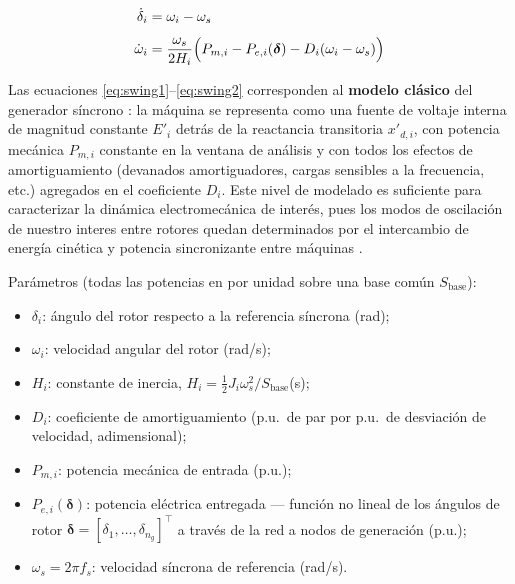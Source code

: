 \begin{align}
    \dot{\delta}_i  &= \omega_i - \omega_s \label{eq:swing1} \\[4pt]
    \dot{\omega}_i  &= \frac{\omega_s}{2H_i}
                       \Bigl(P_{m,i} - P_{e,i}(\boldsymbol{\delta}) - 
                       D_i(\omega_i - \omega_s)\Bigr)
                       \label{eq:swing2}
\end{align}

Las ecuaciones \eqref{eq:swing1}--\eqref{eq:swing2} corresponden al
\textbf{modelo clásico} del generador síncrono \cite{kundur1994}: la máquina
se representa como una fuente de voltaje interna de magnitud constante
$E'_i$ detrás de la reactancia transitoria $x'_{d,i}$, con potencia mecánica
$P_{m,i}$ constante en la ventana de análisis y con todos los efectos de
amortiguamiento (devanados amortiguadores, cargas sensibles a la frecuencia, etc.)
agregados en el coeficiente $D_i$. Este nivel de modelado es suficiente para
caracterizar la dinámica electromecánica de interés, pues los modos de
oscilación de nuestro interes  entre rotores quedan determinados por el intercambio de 
energía cinética y potencia sincronizante entre máquinas \cite{kundur1994,sauer2017}.


Parámetros (todas las potencias en por unidad sobre una base común
$S_{\text{base}}$):

\begin{itemize}
    \item $\delta_i$: ángulo del rotor respecto a la referencia síncrona (rad);
    \item $\omega_i$: velocidad angular del rotor (rad/s);
    \item $H_i$: constante de inercia, $H_i = \tfrac{1}{2}J_i\omega_s^2/S_{\text{base}}$(s);
    \item $D_i$: coeficiente de amortiguamiento (p.u.\ de par por
          p.u.\ de desviación de velocidad, adimensional);
    \item $P_{m,i}$: potencia mecánica de entrada (p.u.);
    \item $P_{e,i}(\boldsymbol{\delta})$: potencia eléctrica entregada ---
          función no lineal de los ángulos de rotor
          $\boldsymbol{\delta} = [\delta_1, \ldots, \delta_{n_g}]^\top$ a
          través de la red a nodos de generación (p.u.);
    \item $\omega_s = 2\pi f_s$: velocidad síncrona de referencia (rad/s).
\end{itemize}

